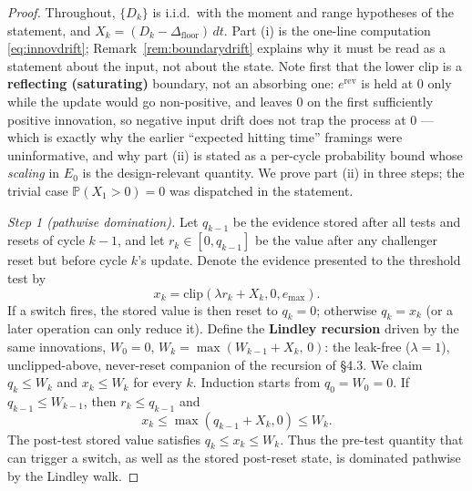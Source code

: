 \documentclass[11pt]{article}
\newcommand{\Dfloor}{\Delta_{\text{floor}}}
\newcommand{\Erev}{e^{\text{rev}}}
\begin{document}
\begin{proof}
Throughout, $\{D_k\}$ is i.i.d.\ with the moment and range hypotheses of the statement, and $X_k = (D_k - \Dfloor)\,dt$. Part (i) is the one-line computation \eqref{eq:innovdrift}; Remark~\ref{rem:boundarydrift} explains why it must be read as a statement about the input, not about the state. Note first that the lower clip is a \textbf{reflecting (saturating)} boundary, not an absorbing one: $\Erev$ is held at $0$ only while the update would go non-positive, and leaves $0$ on the first sufficiently positive innovation, so negative input drift does not trap the process at $0$ --- which is exactly why the earlier ``expected hitting time'' framings were uninformative, and why part (ii) is stated as a per-cycle probability bound whose \emph{scaling} in $E_0$ is the design-relevant quantity. We prove part (ii) in three steps; the trivial case $\mathbb{P}(X_1 > 0) = 0$ was dispatched in the statement.

\emph{Step 1 (pathwise domination).} Let $q_{k-1}$ be the evidence stored after all tests and resets of cycle $k-1$, and let $r_k\in[0,q_{k-1}]$ be the value after any challenger reset but before cycle $k$'s update. Denote the evidence presented to the threshold test by
\[
x_k=\mathrm{clip}(\lambda r_k+X_k,0,e_{\max}).
\]
If a switch fires, the stored value is then reset to $q_k=0$; otherwise $q_k=x_k$ (or a later operation can only reduce it). Define the \textbf{Lindley recursion} \cite{lindley1952queue} driven by the same innovations, $W_0 = 0$, $W_k = \max(W_{k-1} + X_k,\, 0)$: the leak-free ($\lambda = 1$), unclipped-above, never-reset companion of the recursion of \S4.3. We claim $q_k \le W_k$ and $x_k\le W_k$ for every $k$. Induction starts from $q_0=W_0=0$. If $q_{k-1}\le W_{k-1}$, then $r_k\le q_{k-1}$ and
\[
 x_k \le \max(q_{k-1}+X_k,0)\le W_k.
\]
The post-test stored value satisfies $q_k\le x_k\le W_k$. Thus the pre-test quantity that can trigger a switch, as well as the stored post-reset state, is dominated pathwise by the Lindley walk.


\end{proof}
\end{document}
